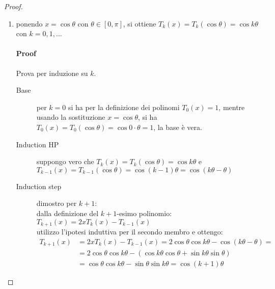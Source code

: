 \begin{proof}
\begin{enumerate}
  \item ponendo $x = \cos\theta$ con $\theta \in [0, \pi]$,  si ottiene
  $T_{k}(x) = T_{k}(\cos\theta) = \cos k\theta$ con $k = 0,1,\ldots$
  
  \paragraph{Proof} Prova per induzione su $k$.
  \begin{description}
  \item[Base] per $k = 0$ si ha per la definizione  dei polinomi $T_{0}(x) = 1$,
  mentre usando la sostituzione $x = \cos\theta$, si ha
  $T_{0}(x) = T_{0}(\cos\theta) = \cos 0\cdot \theta = 1$, la base \`e vera.
  \item[Induction HP] suppongo vero che $T_{k}(x) = T_{k}(\cos\theta) = \cos
  k\theta$ e\\ $T_{k-1}(x) = T_{k-1}(\cos\theta) = \cos
  (k-1)\theta = \cos(k\theta - \theta)$
  \item[Induction step] dimostro per $k+1$:
  \\ dalla definizione del $k+1$-esimo polinomio: $T_{k+1}(x) = 2 x T_{k}(x) -
  T_{k-1}(x)$
  \\ utilizzo l'ipotesi induttiva per il secondo membro e ottengo: 
   \begin{displaymath}
   \begin{split}
   T_{k+1}(x) &= 2 x T_{k}(x) - T_{k-1}(x) = 2\cos\theta \cos k \theta -
   \cos(k\theta - \theta) = \\
   &=2\cos\theta\cos k\theta - (\cos k\theta \cos \theta + \sin k\theta
   \sin\theta) \\
   &= \cos\theta\cos k\theta - \sin\theta \sin k\theta= \cos(k+1)\theta
	\end{split}
	\end{displaymath}
	\end{description}
\end{enumerate}
\end{proof}


